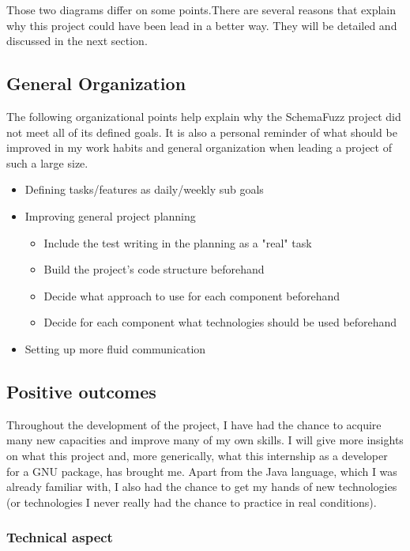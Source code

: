 Those two diagrams differ on some points.There are several reasons that explain why this project could have been lead in a better way. They will be detailed and discussed in the next section. 

	\subsection{General Organization}
The following organizational points help explain why the SchemaFuzz project did not meet all of its defined goals.
It is also a personal reminder of what should be improved in my work habits and general organization when leading a project of such a large size. 
	
	\begin{itemize}
	\item{Defining tasks/features as daily/weekly sub goals}
	\item{Improving general project planning}
		\begin{itemize}
		\item{Include the test writing in the planning as a "real" task}
		\item{Build the project's code structure beforehand}
		\item{Decide what approach to use for each component beforehand}
		\item{Decide for each component what technologies should be used beforehand}
		\end{itemize}
	\item{Setting up more fluid communication}
	\end{itemize}		

	\subsection{Positive outcomes}
Throughout the development of the project, I have had the chance to acquire many new capacities and improve many of my own skills. I will give more insights on what this project and, more generically, what this internship as a developer for a GNU package, has brought me.
Apart from the Java language, which I was already familiar with, I also had the chance to get my hands of new technologies (or technologies I never really had the chance to practice in real conditions). 

		\subsubsection{Technical aspect}
		
